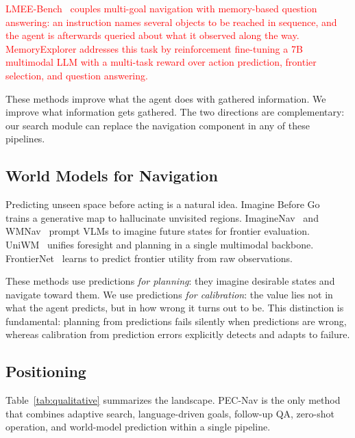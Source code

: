 \textcolor{red}{LMEE-Bench~\cite{wang2026memoryexplorer} couples multi-goal navigation with memory-based question answering: an instruction names several objects to be reached in sequence, and the agent is afterwards queried about what it observed along the way. MemoryExplorer addresses this task by reinforcement fine-tuning a 7B multimodal LLM with a multi-task reward over action prediction, frontier selection, and question answering.}

These methods improve what the agent does with gathered information. We improve what information gets gathered. The two directions are complementary: our search module can replace the navigation component in any of these pipelines.

\subsection{World Models for Navigation}

Predicting unseen space before acting is a natural idea. Imagine Before Go~\cite{zhang2024imaginebefore} trains a generative map to hallucinate unvisited regions. ImagineNav~\cite{zhao2024imaginenav} and WMNav~\cite{nie2025wmnav} prompt VLMs to imagine future states for frontier evaluation. UniWM~\cite{cheng2026uniwm} unifies foresight and planning in a single multimodal backbone. FrontierNet~\cite{sun2025frontiernet} learns to predict frontier utility from raw observations.

These methods use predictions \emph{for planning}: they imagine desirable states and navigate toward them. We use predictions \emph{for calibration}: the value lies not in what the agent predicts, but in how wrong it turns out to be. This distinction is fundamental: planning from predictions fails silently when predictions are wrong, whereas calibration from prediction errors explicitly detects and adapts to failure.

\subsection{Positioning}

Table~\ref{tab:qualitative} summarizes the landscape. PEC-Nav is the only method that combines adaptive search, language-driven goals, follow-up QA, zero-shot operation, and world-model prediction within a single pipeline.

